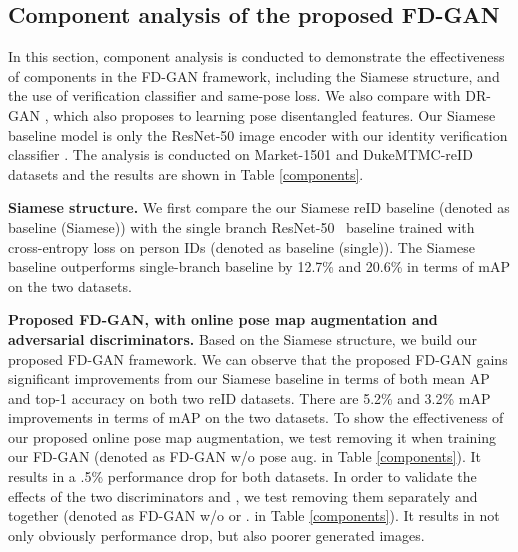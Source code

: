 \documentclass{article}
\begin{document}
\subsection{Component analysis of the proposed FD-GAN}
\label{component}

In this section, component analysis is conducted to demonstrate the effectiveness of components in the FD-GAN framework, including the Siamese structure, and the use of verification classifier and same-pose loss. We also compare with DR-GAN \cite{tran2017disentangled}, which also proposes to learning pose disentangled features. Our Siamese baseline model is only the ResNet-50 image encoder  with our identity verification classifier . 
The analysis is conducted on Market-1501 \citep{market} and DukeMTMC-reID \citep{duke} datasets and the results are shown in Table \ref{components}.

\textbf{Siamese structure.} We first compare the our Siamese reID baseline (denoted as baseline (Siamese)) with the single branch ResNet-50~\cite{he2016deep} baseline trained with cross-entropy loss on person IDs (denoted as baseline (single)). The Siamese baseline outperforms single-branch baseline by 12.7\% and 20.6\% in terms of mAP on the two datasets.

\textbf{Proposed FD-GAN, with online pose map augmentation and adversarial discriminators.} Based on the Siamese structure, we build our proposed FD-GAN framework.
We can observe that the proposed FD-GAN gains significant improvements from our Siamese baseline in terms of both mean AP and top-1 accuracy on both two reID datasets. There are 5.2\% and 3.2\% mAP improvements in terms of mAP on the two datasets. To show the effectiveness of our proposed online pose map augmentation, we test removing it when training our FD-GAN (denoted as FD-GAN w/o pose aug. in Table \ref{components}). It results in a .5\% performance drop for both datasets. 
In order to validate the effects of the two discriminators  and , we test removing them separately and together (denoted as FD-GAN w/o  or . in Table \ref{components}). It results in not only obviously performance drop, but also poorer generated images.
\end{document}
